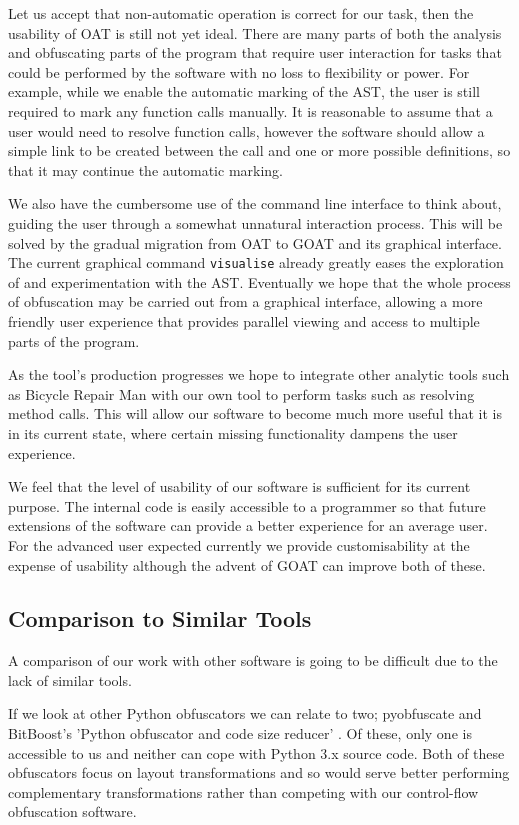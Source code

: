 \documentclass[twoside,a4paper]{report}
\begin{document}
Let us accept that non-automatic operation is correct for our task, then the usability of OAT is still not yet ideal. There are many parts of both the
analysis and obfuscating parts of the program that require user interaction for tasks that could be performed by the software with no loss to flexibility or
power. For example, while we enable the automatic marking of the AST, the user is still required to mark any function calls manually. It is reasonable
to assume that a user would need to resolve function calls, however the software should allow a simple link to be created between the call and one or more
possible definitions, so that it may continue the automatic marking.

We also have the cumbersome use of the command line interface to think about, guiding the user through a somewhat unnatural interaction process. This will be
solved by the gradual migration from OAT to GOAT and its graphical interface. The current graphical command \texttt{visualise} already greatly eases the
exploration of and experimentation with the AST. Eventually we hope that the whole process of obfuscation may be carried out from a graphical interface,
allowing a more friendly user experience that provides parallel viewing and access to multiple parts of the program.

As the tool's production progresses we hope to integrate other analytic tools such as Bicycle Repair Man \cite{bikerepair} with our own tool to
perform tasks such as resolving method calls. This will allow our software to become much more useful that it is in its current state, where certain
missing functionality dampens the user experience.

We feel that the level of usability of our software is sufficient for its current purpose. The internal code is easily accessible to a programmer so that
future extensions of the software can provide a better experience for an average user. For the advanced user expected currently we provide customisability
at the expense of usability although the advent of GOAT can improve both of these.

\subsection{Comparison to Similar Tools}

A comparison of our work with other software is going to be difficult due to the lack of similar tools.

If we look at other Python obfuscators we can relate to two; pyobfuscate \cite{pyobf} and BitBoost's
'Python obfuscator and code size reducer' \cite{bitboost}. Of these, only one is accessible to us and
neither can cope with Python 3.x source code. Both of these obfuscators focus on layout transformations
and so would serve better performing complementary transformations rather than competing with our
control-flow obfuscation software.
\end{document}
